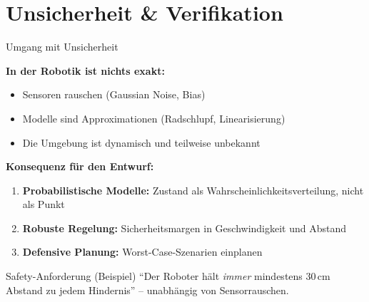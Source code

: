 \documentclass[%
  aspectratio=169,
  10pt
]{beamer}
\newcommand{\SI}[2]{#1\,\text{#2}}
\newcommand{\hl}[1]{{\color{fbblau}\textbf{#1}}}
\newcommand{\warn}[1]{{\color{blackberry}\textbf{#1}}}
\begin{document}
\section{Unsicherheit \& Verifikation}

\begin{frame}{Umgang mit Unsicherheit}

\textbf{In der Robotik ist \warn{nichts} exakt:}
\begin{itemize}
  \item Sensoren rauschen (Gaussian Noise, Bias)
  \item Modelle sind Approximationen (Radschlupf, Linearisierung)
  \item Die Umgebung ist dynamisch und teilweise unbekannt
\end{itemize}

\vspace{3mm}
\textbf{Konsequenz für den Entwurf:}
\begin{enumerate}
  \item \hl{Probabilistische Modelle:}
        Zustand als Wahrscheinlichkeitsverteilung, nicht als Punkt
  \item \hl{Robuste Regelung:}
        Sicherheitsmargen in Geschwindigkeit und Abstand
  \item \hl{Defensive Planung:}
        Worst-Case-Szenarien einplanen
\end{enumerate}

\vspace{3mm}
\begin{block}{Safety-Anforderung (Beispiel)}
  ``Der Roboter hält \emph{immer} mindestens $\SI{30}{cm}$
  Abstand zu jedem Hindernis'' -- unabhängig von Sensorrauschen.
\end{block}

\end{frame}
\end{document}

